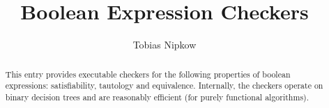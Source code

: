 \documentclass[11pt,a4paper]{article}
\begin{document}
\title{Boolean Expression Checkers}
\author{Tobias Nipkow}
\maketitle

\begin{abstract}
This entry provides executable checkers for the following properties of
boolean expressions: satisfiability, tautology and equivalence. Internally,
the checkers operate on binary decision trees and are reasonably efficient
(for purely functional algorithms).
\end{abstract}

\tableofcontents



%
%
\end{document}
